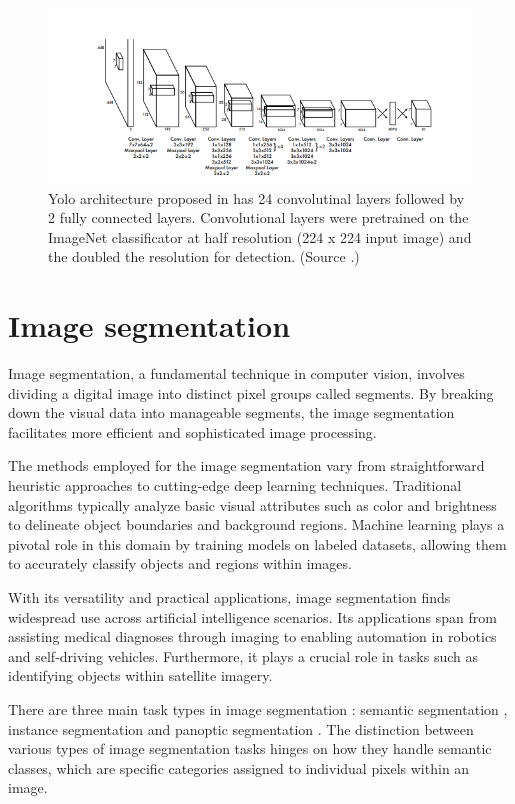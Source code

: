 \begin{figure}
  \centering
  \includegraphics[width=\linewidth]{text/chapter_03/imgs/YOLO_architecture}
  \caption{Yolo architecture proposed in \cite{YOLORedmon2016} has 24 convolutinal layers followed by 2 fully connected layers. Convolutional layers were pretrained on the ImageNet classificator at half resolution (224 x 224 input image) and the doubled the resolution for detection. (Source \cite{YOLORedmon2016}.)}
  \label{fig:yoloArchitecture}
\end{figure}


\section{Image segmentation}
Image segmentation, a fundamental technique in computer vision, involves dividing a digital image into distinct pixel groups called segments. By breaking down the visual data into manageable segments, the image segmentation facilitates more efficient and sophisticated image processing.

The methods employed for the image segmentation vary from straightforward heuristic approaches to cutting-edge deep learning techniques. Traditional algorithms typically analyze basic visual attributes such as color and brightness to delineate object boundaries and background regions. Machine learning plays a pivotal role in this domain by training models on labeled datasets, allowing them to accurately classify objects and regions within images.

With its versatility and practical applications, image segmentation finds widespread use across artificial intelligence scenarios. Its applications span from assisting medical diagnoses through imaging to enabling automation in robotics and self-driving vehicles. Furthermore, it plays a crucial role in tasks such as identifying objects within satellite imagery.

There are three main task types in image segmentation \cite{IBM}: semantic segmentation \cite{SemanticSegmentationGuo2022},
instance segmentation \cite{yanYolo2023} and panoptic
segmentation \cite{mohan2020efficientps}.
The distinction between various types of image segmentation tasks hinges on how they handle semantic classes, which are specific categories assigned to individual pixels within an image.

